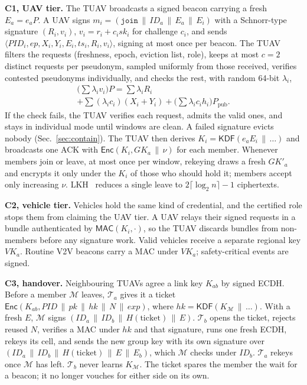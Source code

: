 \documentclass[conference]{IEEEtran}
\newcommand{\Ppub}{P_{\mathrm{pub}}}
\newcommand{\PID}{\mathit{PID}}
\newcommand{\GK}{\mathit{GK}}
\newcommand{\VK}{\mathit{VK}}
\newcommand{\pk}{\mathit{pk}}
\newcommand{\sk}{\mathit{sk}}
\newcommand{\ep}{\mathit{ep}}
\newcommand{\cat}{\,\|\,}
\newcommand{\Enc}{\mathsf{Enc}}
\newcommand{\KDF}{\mathsf{KDF}}
\newcommand{\MAC}{\mathsf{MAC}}
\begin{document}
\textbf{C1, UAV tier.} The TUAV broadcasts a signed beacon carrying a fresh $E_a=e_aP$. A UAV signs $m_i=(\texttt{join}\cat ID_a\cat E_a\cat E_i)$ with a
Schnorr-type signature $(R_i,v_i)$, $v_i=r_i+c_i\sk_i$ for challenge $c_i$, and sends $\langle\PID_i,\ep,X_i,Y_i,E_i,ts_i,R_i,v_i\rangle$, signing at most once per beacon.
The TUAV filters the requests (freshness, epoch, eviction list, role), keeps at most $c=2$ distinct requests per pseudonym, sampled uniformly from those received, verifies
contested pseudonyms individually, and checks the rest, with random 64-bit $\lambda_i$,
\begin{multline}
\Big(\sum\lambda_iv_i\Big)P=\sum\lambda_iR_i\\
+\sum(\lambda_ic_i)(X_i+Y_i)+\Big(\sum\lambda_ic_ih_i\Big)\Ppub.\label{eq:bv}
\end{multline}
If the check fails, the TUAV verifies each request, admits the valid ones, and stays in individual mode until windows are clean. A failed signature evicts nobody
(Sec.~\ref{sec:contain}). The TUAV then derives $K_i=\KDF(e_aE_i\cat\dots)$ and broadcasts one ACK with $\Enc(K_i,\GK_a\cat\nu)$ for each member. Whenever members join or
leave, at most once per window, rekeying draws a fresh $\GK'_a$ and encrypts it only under the $K_i$ of those who should hold it; members accept only increasing $\nu$.
LKH~\cite{lkh} reduces a single leave to $2\lceil\log_2 n\rceil-1$ ciphertexts.

\textbf{C2, vehicle tier.} Vehicles hold the same kind of credential, and the certified role stops them from claiming the UAV tier. A UAV relays their signed requests in a bundle authenticated by $\MAC(K_i,\cdot)$, so the TUAV
discards bundles from non-members before any signature work. Valid vehicles receive a separate regional key $\VK_a$. Routine V2V beacons carry a MAC under
$\VK_a$; safety-critical events are signed.

\textbf{C3, handover.} Neighbouring TUAVs agree a link key $K_{ab}$ by signed ECDH. Before a member $\mathcal M$ leaves, $\mathcal T_a$
gives it a ticket $\Enc(K_{ab},\PID\cat\pk\cat hk\cat N\cat exp)$, where $hk=\KDF(K_\mathcal M\cat\dots)$. With a fresh $E$, $\mathcal M$ signs
$(ID_a\cat ID_b\cat H(\text{ticket})\cat E)$. $\mathcal T_b$ opens the ticket, rejects reused $N$, verifies a MAC under $hk$ and that signature, runs one fresh ECDH, rekeys
its cell, and sends the new group key with its own signature over $(ID_a\cat ID_b\cat H(\text{ticket})\cat E\cat E_b)$, which $\mathcal M$ checks under $ID_b$.
$\mathcal T_a$ rekeys once $\mathcal M$ has left. $\mathcal T_b$ never learns $K_\mathcal M$. The ticket spares the member the wait for a beacon; it no longer vouches
for either side on its own.
\end{document}
